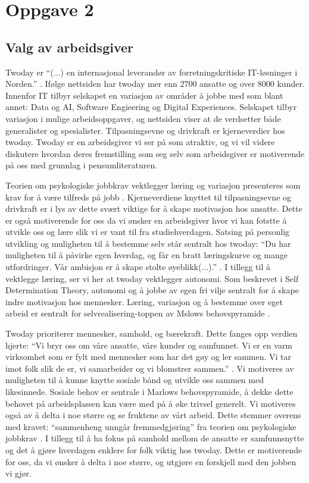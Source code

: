 \section{Oppgave 2}
\subsection{Valg av arbeidsgiver}
Twoday er \enquote{(...) en internasjonal leverandør av forretningskritiske IT-løsninger i Norden.}
\cite{twoday.no}. Ifølge nettsiden har twoday mer enn 2700 ansatte og over 8000 kunder. Innenfor IT
tilbyr selskapet en variasjon av områder å jobbe med som blant annet: Data og AI, Software Engieering
og Digital Experiences. Selskapet tilbyr variasjon i mulige arbeidsoppgaver, og nettsiden viser at de
verdsetter både generalister og spesialister. Tilpasningsevne og drivkraft er kjerneverdier hos twoday. Twoday er
en arbeidsgiver vi ser på som atraktiv, og vi vil videre diskutere hvordan deres fremstilling som seg selv som 
arbeidsgiver er motiverende på oss med grunnlag i pensumliteraturen. 

Teorien om psykologiske jobbkrav vektlegger læring og variasjon presenteres som krav for å være tilfreds på jobb \parencite[][s.120]{Teknologiledelse}. 
Kjerneverdiene knyttet til tilpasningsevne og drivkraft er i lys av dette svært viktige for å skape motivasjon hos ansatte. Dette er også motiverende for 
oss da vi ønsker en arbeidsgiver hvor vi kan fotstte å utvikle oss og lære slik vi er vant til fra studiehverdagen.
Satsing på personlig utvikling og muligheten til å bestemme selv står sentralt hos twoday: \enquote{Du har muligheten
til å påvirke egen hverdag, og får en bratt læringskurve og mange utfordringer. Vår ambisjon er å
skape stolte øyeblikk(...).} \parencite["Graduateprogrammet"]{twoday.no}. I tillegg til å vektlegge læring, ser
vi her at twoday vektlegger autonomi. Som beskrevet i Self Determination Theory\parencite[][s.121]{Teknologiledelse},
autonomi og å jobbe av egen fri vilje sentralt for å skape indre motivasjon hos mennesker. Læring,
variasjon og å bestemme over eget arbeid er sentralt for selvrealisering-toppen av Mslows
behovspyramide \parencite[][s.116]{Teknologiledelse}.

Twoday prioriterer mennesker, samhold, og bærekraft. Dette fanges opp verdien hjerte:
“Vi bryr oss om våre ansatte, våre kunder og samfunnet. Vi er en varm virksomhet som er fylt
med mennesker som har det gøy og ler sammen. Vi tar imot folk slik de er, vi samarbeider og vi
blomstrer sammen.” \parencite["Om oss"]{twoday.no}. Vi motiveres av muligheten til å kunne knytte sosiale bånd
og utvikle oss sammen med likesinnede. Sosiale behov er sentrale i Marlows behovspyramide, å dekke
dette behovet på arbeidsplassen kan være med på å øke trivsel generelt. Vi motiveres også av å delta
i noe større og se fruktene av vårt arbeid. Dette stemmer overens med kravet: “sammenheng unngår
fremmedgjøring” fra teorien om psykologiske jobbkrav \parencite[][s.120]{Teknologiledelse}. I tillegg til å ha fokus på samhold
mellom de ansatte er samfunnsnytte og det å gjøre hverdagen enklere for folk viktig hos
twoday\parencite["Graduateprogrammet"]{twoday.no}. Dette er motiverende for oss, da vi ønsker å delta i noe
større, og utgjøre en forskjell med den jobben vi gjør.

